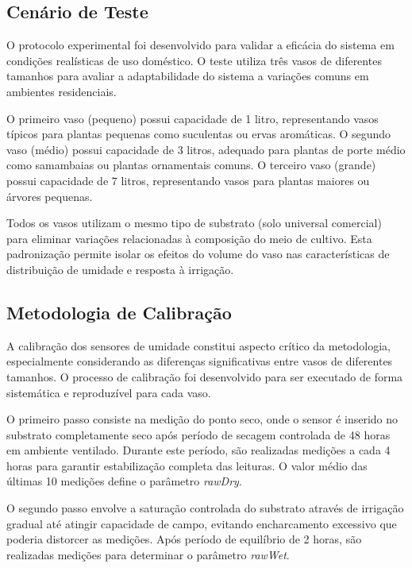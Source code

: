 \documentclass[twoside,english,brazilian]{UNISINOSmonografia}
\begin{document}
\subsection{Cenário de Teste}

O protocolo experimental foi desenvolvido para validar a eficácia do sistema em condições realísticas de uso doméstico. O teste utiliza três vasos de diferentes tamanhos para avaliar a adaptabilidade do sistema a variações comuns em ambientes residenciais.

O primeiro vaso (pequeno) possui capacidade de 1 litro, representando vasos típicos para plantas pequenas como suculentas ou ervas aromáticas. O segundo vaso (médio) possui capacidade de 3 litros, adequado para plantas de porte médio como samambaias ou plantas ornamentais comuns. O terceiro vaso (grande) possui capacidade de 7 litros, representando vasos para plantas maiores ou árvores pequenas.

Todos os vasos utilizam o mesmo tipo de substrato (solo universal comercial) para eliminar variações relacionadas à composição do meio de cultivo. Esta padronização permite isolar os efeitos do volume do vaso nas características de distribuição de umidade e resposta à irrigação.

\subsection{Metodologia de Calibração}

A calibração dos sensores de umidade constitui aspecto crítico da metodologia, especialmente considerando as diferenças significativas entre vasos de diferentes tamanhos. O processo de calibração foi desenvolvido para ser executado de forma sistemática e reproduzível para cada vaso.

O primeiro passo consiste na medição do ponto seco, onde o sensor é inserido no substrato completamente seco após período de secagem controlada de 48 horas em ambiente ventilado. Durante este período, são realizadas medições a cada 4 horas para garantir estabilização completa das leituras. O valor médio das últimas 10 medições define o parâmetro \textit{rawDry}.

O segundo passo envolve a saturação controlada do substrato através de irrigação gradual até atingir capacidade de campo, evitando encharcamento excessivo que poderia distorcer as medições. Após período de equilíbrio de 2 horas, são realizadas medições para determinar o parâmetro \textit{rawWet}.
\end{document}
